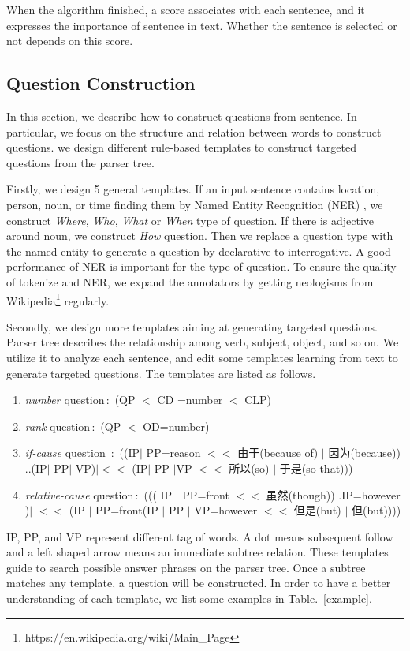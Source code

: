 \documentclass[runningheads,UTF8,article]{comsis2}
\newcommand\revised[1]{{\color{black} #1}}
\begin{document}
	When the algorithm finished, a score associates with each sentence, and it expresses the importance of sentence in text. Whether the sentence is selected or not depends on this score.
	
	\subsection{Question Construction}
	In this section, we describe how to construct questions from sentence. In particular, we focus on the structure and relation between words to construct questions. we design different rule-based templates to construct targeted questions from the parser tree.
	
	Firstly, we design 5 general templates. If an input sentence contains location, person, noun, or time finding them by Named Entity Recognition (NER) , we construct \emph{Where}, \emph{Who}, \emph{What} or \emph{When} type of question. If there is adjective around noun, we construct \emph{How} question. Then we replace a question type with the named entity to generate a question by declarative-to-interrogative. A good performance of NER is important for the type of question. To ensure the quality of tokenize and NER, we expand the annotators by getting neologisms from Wikipedia\footnote{https://en.wikipedia.org/wiki/Main\_Page} regularly.
	
	Secondly, we design more templates aiming at generating targeted questions. Parser tree describes the relationship among verb, subject, object, and so on. We utilize it to analyze each sentence, and edit some templates learning from text to generate targeted questions. The templates are listed as follows.
	\begin{enumerate}
		\item{\emph{number} question\,:\, (QP $ < $ CD =number  $ < $ CLP)}
		\item{\emph{rank} question\,:\, (QP $ < $ OD=number)}
		\item{\emph{if-cause} question \,:\, ((IP$ | $ PP=reason $ << $ 由于(because of) $ | $ 因为(because)) ..(IP$ | $ PP$ | $ VP)$ |<< $ (IP$ | $ PP $ | $VP $ << $ 所以(so) $ | $ 于是(so that)))}
		\item{\emph{relative-cause} question\,:\, ((( IP $ | $ PP=front $ << $ 虽然(though)) .IP=however )$ | $ $<<$ (IP $|$ PP=front(IP $|$ PP $|$ VP=however $<<$ 但是(but) $|$ 但(but)))) }
	\end{enumerate}
	
	IP, PP, and VP represent different tag of words. A dot means subsequent follow and a left shaped arrow means an immediate subtree relation. These templates guide to search possible answer phrases on the parser tree. Once a subtree matches any template, a question will be constructed.
	\revised{
	In order to have a better understanding of each template, we list some examples in Table.~\ref{example}.}
	 
\end{document}
